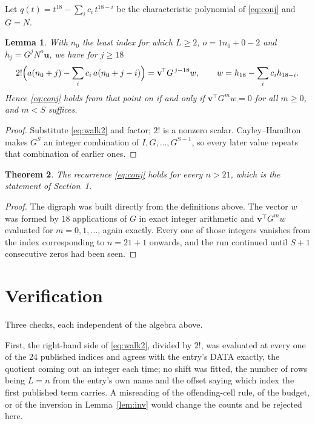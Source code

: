 \documentclass[11pt,a4paper]{article}
\theoremstyle{plain}
\newtheorem{theorem}{Theorem}
\newtheorem{lemma}[theorem]{Lemma}
\theoremstyle{definition}
\begin{document}
Let $q(t)=t^{18}-\sum_i c_i\,t^{18-i}$ be the characteristic polynomial of
\eqref{eq:conj} and $G=N$.

\begin{lemma}\label{lem:crit}
With $n_0$ the least index for which $L\ge2$, $o=1n_0+0-2$ and
$h_j=G^{j}N^{o}\mathbf{u}$, we have for $j\ge18$
\[
2!\Bigl(a(n_0+j)-\sum_i c_i\,a(n_0+j-i)\Bigr)=\mathbf{v}^{\!\top}G^{\,j-18}w,
\qquad w=h_{18}-\sum_i c_i h_{18-i} .
\]
Hence \eqref{eq:conj} holds from that point on if and only if
$\mathbf{v}^{\!\top}G^{m}w=0$ for all $m\ge0$, and $m<S$ suffices.
\end{lemma}

\begin{proof}
Substitute \eqref{eq:walk2} and factor; $2!$ is a nonzero scalar. Cayley--Hamilton
makes $G^{S}$ an integer combination of $I,G,\dots,G^{S-1}$, so every later value repeats
that combination of earlier ones.
\end{proof}

\begin{theorem}
The recurrence \eqref{eq:conj} holds for every $n>21$, which is the statement of
Section~1.
\end{theorem}

\begin{proof}
The digraph was built directly from the definitions above. The vector $w$ was formed by
$18$ applications of $G$ in exact integer arithmetic and $\mathbf{v}^{\!\top}G^{m}w$
evaluated for $m=0,1,\dots$, again exactly. Every one of those integers vanishes from the
index corresponding to $n=21+1$ onwards, and the run continued until $S+1$ consecutive
zeros had been seen.
\end{proof}

\section{Verification}

Three checks, each independent of the algebra above.

First, the right-hand side of \eqref{eq:walk2}, divided by $2!$, was evaluated at every
one of the $24$ published indices and agrees with the entry's DATA exactly, the quotient
coming out an integer each time; no shift was fitted, the number of rows being
$L=n$ from the entry's own name and the offset saying which index the first published
term carries. A misreading of the offending-cell rule, of the budget, or of the inversion in
Lemma~\ref{lem:inv} would change the counts and be rejected here.
\end{document}
